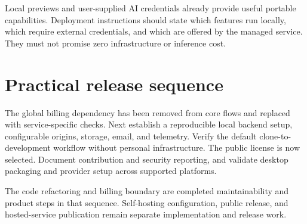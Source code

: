 \documentclass[11pt,a4paper]{article}
\begin{document}
Local previews and user-supplied AI credentials already provide useful portable
capabilities. Deployment instructions should state which features run locally,
which require external credentials, and which are offered by the managed
service. They must not promise zero infrastructure or inference cost.

\section{Practical release sequence}
The global billing dependency has been removed from core flows and replaced
with service-specific checks. Next establish a reproducible local backend
setup, configurable origins, storage, email, and telemetry. Verify the default
clone-to-development workflow without personal infrastructure. The public
license is now selected. Document contribution and security reporting, and
validate desktop packaging and provider setup across supported platforms.

The code refactoring and billing boundary are completed maintainability and
product steps in that sequence. Self-hosting configuration, public release,
and hosted-service publication remain separate implementation and release work.
\end{document}
